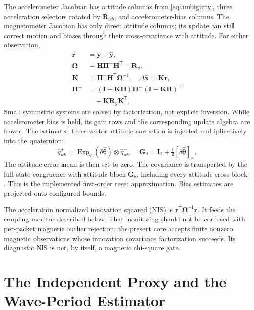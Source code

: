 \documentclass[conference]{IEEEtran}
\newcommand{\vc}[1]{\bm{#1}}
\newcommand{\mt}[1]{\bm{#1}}
\newcommand{\tr}{^{\mathsf T}}
\newcommand{\sk}[1]{[#1]_\times}
\begin{document}
The accelerometer Jacobian has attitude columns from
\cref{eq:ambiguity}, three acceleration selectors rotated by $\mt R_{wb}$,
and accelerometer-bias columns. The magnetometer Jacobian has only direct
attitude columns; its update can still correct motion and biases through
their cross-covariance with attitude. For either observation,
\begin{align}
 \vc r&=\vc y-\hat{\vc y},\nonumber\\
 \mt\Omega&=\mt H\mt\Pi^-\mt H\tr+\mt R_y,\nonumber\\
 \mt K&=\mt\Pi^-\mt H\tr\mt\Omega^{-1},\quad
 \Delta\hat{\vc x}=\mt K\vc r,\label{eq:update}\\
 \mt\Pi^+&=(\mt I-\mt K\mt H)\mt\Pi^-(\mt I-\mt K\mt H)\tr\nonumber\\
           &\quad+\mt K\mt R_y\mt K\tr.\nonumber
\end{align}
Small symmetric systems are solved by factorization, not explicit
inversion. While accelerometer bias is held, its gain rows and the
corresponding update algebra are frozen. The estimated three-vector
attitude correction is injected multiplicatively into the quaternion:
\begin{equation}
 \hat q_{wb}^+=\operatorname{Exp}_q(\delta\hat{\vc\theta})\otimes\hat q_{wb}^-,\quad
 \mt G_\theta=\mt I_3+\tfrac12\sk{\delta\hat{\vc\theta}}.
 \label{eq:reset}
\end{equation}
The attitude-error mean is then set to zero. The covariance is transported
by the full-state congruence with attitude block $\mt G_\theta$, including
every attitude cross-block \cite{markley}. This is the implemented
first-order reset approximation. Bias estimates are projected onto
configured bounds.

The acceleration normalized innovation squared (NIS) is
$\vc r\tr\mt\Omega^{-1}\vc r$. It feeds the coupling monitor described
below. That monitoring should not be confused with per-packet magnetic
outlier rejection: the present core accepts finite nonzero magnetic
observations whose innovation covariance factorization succeeds. Its
diagnostic NIS is not, by itself, a magnetic chi-square gate.

\section{The Independent Proxy and the Wave-Period Estimator}
\label{sec:proxy}
\end{document}
